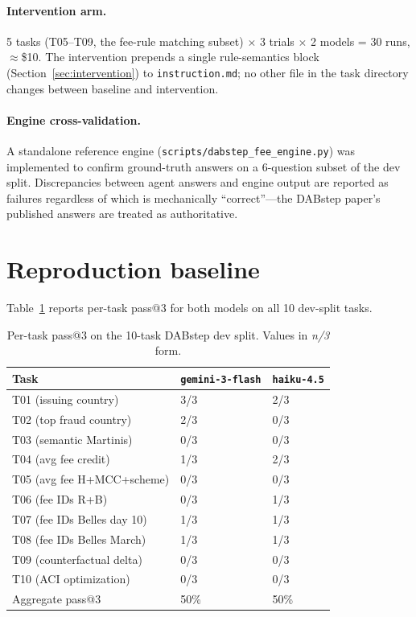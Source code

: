 \documentclass[11pt]{article}
\begin{document}
\paragraph{Intervention arm.} 5 tasks (T05--T09, the fee-rule matching subset) $\times$ 3 trials
$\times$ 2 models = 30 runs, $\approx$\$10. The intervention prepends a single rule-semantics
block (Section~\ref{sec:intervention}) to \texttt{instruction.md}; no other file in the task
directory changes between baseline and intervention.

\paragraph{Engine cross-validation.} A standalone reference engine
(\texttt{scripts/dabstep\_fee\_engine.py}) was implemented to confirm ground-truth answers
on a 6-question subset of the dev split. Discrepancies between agent answers and engine output
are reported as failures regardless of which is mechanically ``correct''---the DABstep paper's
published answers are treated as authoritative.

\section{Reproduction baseline}
\label{sec:reproduction}


Table~\ref{tab:baseline} reports per-task pass@3 for both models on all 10 dev-split tasks.

\begin{table}[h]
\centering
\caption{Per-task pass@3 on the 10-task DABstep dev split. Values in \emph{n/3} form.}
\label{tab:baseline}
\begin{tabular}{lll}
\toprule
Task & \texttt{gemini-3-flash} & \texttt{haiku-4.5} \\
\midrule
T01 (issuing country) & 3/3 & 2/3 \\
T02 (top fraud country) & 2/3 & 0/3 \\
T03 (semantic Martinis) & 0/3 & 0/3 \\
T04 (avg fee credit) & 1/3 & 2/3 \\
T05 (avg fee H+MCC+scheme) & 0/3 & 0/3 \\
T06 (fee IDs R+B) & 0/3 & 1/3 \\
T07 (fee IDs Belles day 10) & 1/3 & 1/3 \\
T08 (fee IDs Belles March) & 1/3 & 1/3 \\
T09 (counterfactual delta) & 0/3 & 0/3 \\
T10 (ACI optimization) & 0/3 & 0/3 \\
\midrule
Aggregate pass@3 & 50\% & 50\% \\
\bottomrule
\end{tabular}
\end{table}
\end{document}
